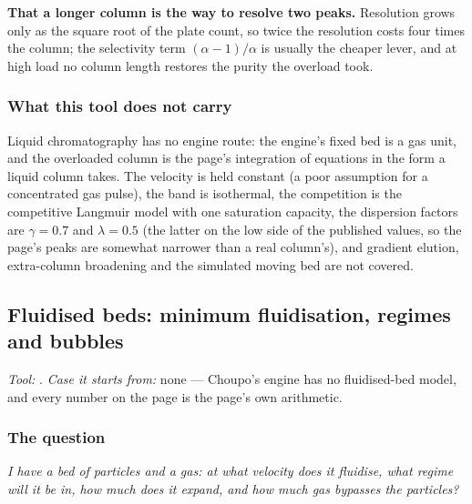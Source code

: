 \documentclass[11pt,a4paper]{article}
\begin{document}
\begin{pitfall}
\textbf{That a longer column is the way to resolve two peaks.}  Resolution
grows only as the square root of the plate count, so twice the resolution
costs four times the column; the selectivity term $(\alpha-1)/\alpha$ is
usually the cheaper lever, and at high load no column length restores the
purity the overload took.
\end{pitfall}

\subsubsection*{What this tool does not carry}

Liquid chromatography has no engine route: the engine's fixed bed is a gas
unit, and the overloaded column is the page's integration of equations in
the form a liquid column takes.  The velocity is held constant (a poor
assumption for a concentrated gas pulse), the band is isothermal, the
competition is the competitive Langmuir model with one saturation capacity,
the dispersion factors are $\gamma=0.7$ and $\lambda=0.5$ (the latter on the
low side of the published values, so the page's peaks are somewhat narrower
than a real column's), and gradient elution, extra-column broadening and the simulated moving bed
are not covered.

\subsection{Fluidised beds: minimum fluidisation, regimes and bubbles}\label{sec:edu-fluidised-beds}


\noindent\textit{\small Tool:} .  \textit{\small
Case it starts from:} none --- Choupo's engine has no fluidised-bed model, and
every number on the page is the page's own arithmetic.

\subsubsection*{The question}

\emph{I have a bed of particles and a gas: at what velocity does it fluidise,
what regime will it be in, how much does it expand, and how much gas bypasses
the particles?}
\end{document}
